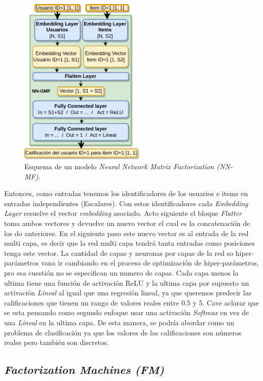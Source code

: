 \documentclass[11pt,a4paper,twoside]{thesis}
\begin{document}
\begin{figure}[h!]
	\centering
	\includegraphics[width=6cm]{./images/NN-MF.png}

	\caption{
		Esquema de un modelo \textit{Neural Network Matrix Factorization (NN-MF)}.
	}
	\label{fig:NNMFModel}
\end{figure}

Entonces, como entradas tenemos los identificadores de los usuarios e items en
entradas independientes (Escalares). Con estos identificadores cada
\textit{Embedding Layer} resuelve el vector \textit{embedding} asociado. Acto
siguiente el bloque \textit{Flatter} toma ambos vectores y devuelve un nuevo
vector el cual es la concatenación de los do anteriores. En el siguiente paso
este nuevo vector es al entrada de la red multi capa, es decir que la red multi
capa tendrá tanta entradas como posiciones tenga este vector. La cantidad de
capas y neuronas por capas de la red so hiper-parámetros vana ir cambiando en
el proceso de optimización de hiper-parámetros, pro esa cuestión no se
especifican un numero de capas. Cada capa menos la ultima tiene una función de
activación ReLU y la ultima capa por supuesto un activación \textit{Lineal} al
igual que una regresión lineal, ya que queremos predecir las calificaciones que
tienen un rango de valores reales entre 0.5 y 5. Cave aclarar que se esta
pensando como segundo enfoque usar una activación \textit{Softmax} en vez de
una \textit{Lineal} en la ultima capa. De esta manera, se podría abordar como
un problema de clasificación ya que los valores de las calificaciones son
números reales pero también son discretos.

\clearpage

\subsection{\textit{Factorization Machines (FM)}}
\end{document}
